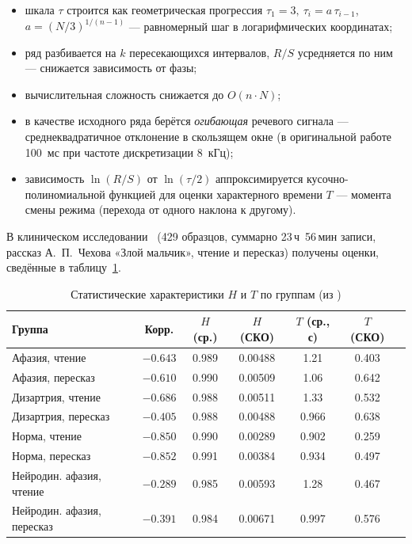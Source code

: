 \documentclass[12pt,a4paper]{article}
\begin{document}
\begin{itemize}
  \item шкала $\tau$ строится как геометрическая прогрессия
    $\tau_1=3,\ \tau_i = a\,\tau_{i-1}$, $a=(N/3)^{1/(n-1)}$ — равномерный шаг
    в логарифмических координатах;
  \item ряд разбивается на $k$ пересекающихся интервалов, $R/S$ усредняется по
    ним — снижается зависимость от фазы;
  \item вычислительная сложность снижается до $O(n\cdot N)$;
  \item в качестве исходного ряда берётся \emph{огибающая} речевого сигнала —
    среднеквадратичное отклонение в скользящем окне (в оригинальной работе
    100~мс при частоте дискретизации 8~кГц);
  \item зависимость $\ln(R/S)$ от $\ln(\tau/2)$ аппроксимируется
    кусочно-полиномиальной функцией для оценки характерного времени $T$ —
    момента смены режима (перехода от одного наклона к другому).
\end{itemize}

В клиническом исследовании~\cite{kuzenkov2014} (429 образцов, суммарно
23\,ч~56\,мин записи, рассказ А.~П.~Чехова «Злой мальчик», чтение и
пересказ) получены оценки, сведённые в таблицу~\ref{tab:kuzenkov-results}.

\begin{table}[h]
\centering
\caption{Статистические характеристики $H$ и $T$ по группам
(из \cite{kuzenkov2014})}
\label{tab:kuzenkov-results}
\small
\begin{tabular}{lcccccc}
\toprule
Группа & Корр. & $H$ (ср.) & $H$ (СКО) & $T$ (ср., с) & $T$ (СКО) \\
\midrule
Афазия, чтение        & $-0.643$ & 0.989 & 0.00488 & 1.21  & 0.403 \\
Афазия, пересказ       & $-0.610$ & 0.990 & 0.00509 & 1.06  & 0.642 \\
Дизартрия, чтение      & $-0.686$ & 0.988 & 0.00511 & 1.33  & 0.532 \\
Дизартрия, пересказ    & $-0.405$ & 0.988 & 0.00488 & 0.966 & 0.638 \\
Норма, чтение          & $-0.850$ & 0.990 & 0.00289 & 0.902 & 0.259 \\
Норма, пересказ        & $-0.852$ & 0.991 & 0.00384 & 0.934 & 0.497 \\
Нейродин. афазия, чтение    & $-0.289$ & 0.985 & 0.00593 & 1.28 & 0.467 \\
Нейродин. афазия, пересказ  & $-0.391$ & 0.984 & 0.00671 & 0.997 & 0.576 \\
\bottomrule
\end{tabular}
\end{table}
\end{document}
